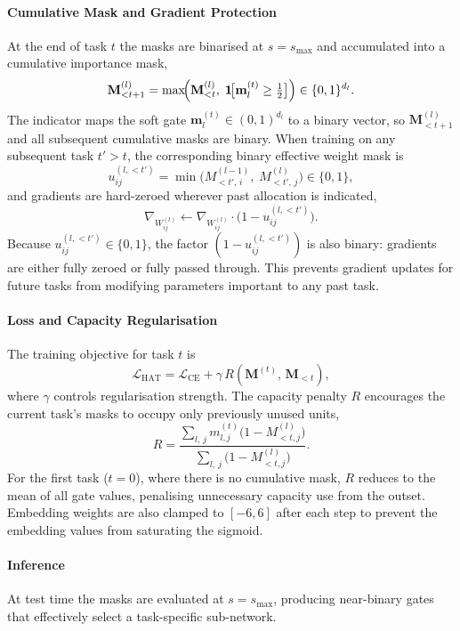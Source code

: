\paragraph{Cumulative Mask and Gradient Protection}

At the end of task $t$ the masks are binarised at $s = s_\text{max}$ and
accumulated into a cumulative importance mask,
%
\begin{equation}\label{eqn:hat_cumask}
    \mathbf{M}_{<t+1}^{(l)}
    =
    \max\!\Bigl(
        \mathbf{M}_{<t}^{(l)},\;
        \mathbf{1}\!\bigl[\mathbf{m}_l^{(t)} \geq \tfrac{1}{2}\bigr]
    \Bigr)
    \in \{0,1\}^{d_l} .
\end{equation}
%
The indicator maps the soft gate $\mathbf{m}_l^{(t)} \in (0,1)^{d_l}$ to a
binary vector, so $\mathbf{M}_{<t+1}^{(l)}$ and all subsequent cumulative masks
are binary. When training on any subsequent task $t' > t$, the corresponding
binary effective weight mask is
%
\begin{equation}\label{eqn:hat_cumweight_mask}
    u_{ij}^{(l,<t')}
    =
    \min\!\bigl(M_{<t',\,i}^{(l-1)},\; M_{<t',\,j}^{(l)}\bigr)
    \in \{0,1\} ,
\end{equation}
%
and gradients are hard-zeroed wherever past allocation is indicated,
%
\begin{equation}\label{eqn:hat_grad_protect}
    \nabla_{W_{ij}^{(l)}}
    \leftarrow
    \nabla_{W_{ij}^{(l)}}
    \cdot
    \bigl(1 - u_{ij}^{(l,<t')}\bigr) .
\end{equation}
%
Because $u_{ij}^{(l,<t')} \in \{0,1\}$, the factor $(1 - u_{ij}^{(l,<t')})$
is also binary: gradients are either fully zeroed or fully passed through.
This prevents gradient updates for future tasks from modifying parameters
important to any past task.

\paragraph{Loss and Capacity Regularisation}

The training objective for task $t$ is
%
\begin{equation}\label{eqn:hat_loss}
    \mathcal{L}_\text{HAT}
    =
    \mathcal{L}_\text{CE}
    +
    \gamma\,R\!\left(\mathbf{M}^{(t)},\,\mathbf{M}_{<t}\right) ,
\end{equation}
%
where $\gamma$ controls regularisation strength. The capacity penalty $R$
encourages the current task's masks to occupy only previously unused units,
%
\begin{equation}\label{eqn:hat_reg}
    R
    =
    \frac{
        \displaystyle\sum_{l,\,j}
        m_{l,j}^{(t)}\!\bigl(1 - M_{<t,j}^{(l)}\bigr)
    }{
        \displaystyle\sum_{l,\,j}
        \bigl(1 - M_{<t,j}^{(l)}\bigr)
    } .
\end{equation}
%
For the first task ($t = 0$), where there is no cumulative mask, $R$ reduces to
the mean of all gate values, penalising unnecessary capacity use from the outset.
Embedding weights are also clamped to $[-6, 6]$ after each step to prevent the
embedding values from saturating the sigmoid.

\paragraph{Inference}

At test time the masks are evaluated at $s = s_\text{max}$, producing near-binary
gates that effectively select a task-specific sub-network.
